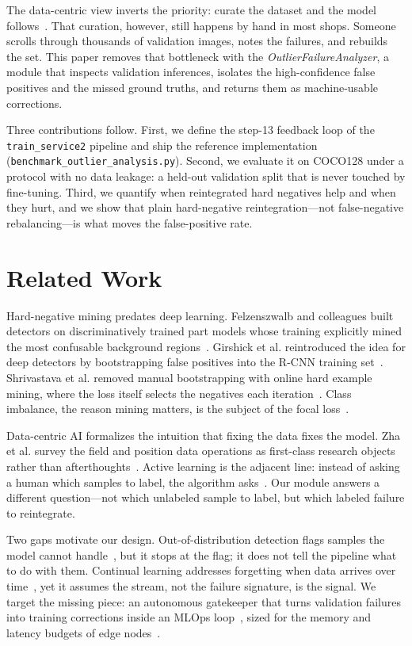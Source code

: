 \documentclass[conference]{IEEEtran}
\begin{document}
The data-centric view inverts the priority: curate the dataset and the model
follows~\cite{zha2023datacentric}. That curation, however, still happens by
hand in most shops. Someone scrolls through thousands of validation images,
notes the failures, and rebuilds the set. This paper removes that bottleneck
with the \textit{OutlierFailureAnalyzer}, a module that inspects validation
inferences, isolates the high-confidence false positives and the missed ground
truths, and returns them as machine-usable corrections.

Three contributions follow. First, we define the step-13 feedback loop of the
\texttt{train\_service2} pipeline and ship the reference implementation
(\texttt{benchmark\_outlier\_analysis.py}). Second, we evaluate it on COCO128
under a protocol with no data leakage: a held-out validation split that is
never touched by fine-tuning. Third, we quantify when reintegrated hard
negatives help and when they hurt, and we show that plain hard-negative
reintegration---not false-negative rebalancing---is what moves the
false-positive rate.

\section{Related Work}
Hard-negative mining predates deep learning. Felzenszwalb and colleagues
built detectors on discriminatively trained part models whose training
explicitly mined the most confusable background regions~\cite{felzenszwalb2010dpm}.
Girshick et al. reintroduced the idea for deep detectors by bootstrapping
false positives into the R-CNN training set~\cite{girshick2014rcnn}.
Shrivastava et al. removed manual bootstrapping with online hard example
mining, where the loss itself selects the negatives each
iteration~\cite{shrivastava2016hard}. Class imbalance, the reason mining
matters, is the subject of the focal loss~\cite{lin2017focal}.

Data-centric AI formalizes the intuition that fixing the data fixes the
model. Zha et al. survey the field and position data operations as first-class
research objects rather than afterthoughts~\cite{zha2023datacentric}. Active
learning is the adjacent line: instead of asking a human which samples to
label, the algorithm asks~\cite{settles2012active}. Our module answers a
different question---not which unlabeled sample to label, but which labeled
failure to reintegrate.

Two gaps motivate our design. Out-of-distribution detection flags samples the
model cannot handle~\cite{hendrycks2017ood}, but it stops at the flag; it does
not tell the pipeline what to do with them. Continual learning addresses
forgetting when data arrives over time~\cite{parisi2019continual}, yet it
assumes the stream, not the failure signature, is the signal. We target the
missing piece: an autonomous gatekeeper that turns validation failures into
training corrections inside an MLOps loop~\cite{kreuzberger2023mlops}, sized
for the memory and latency budgets of edge nodes~\cite{zhou2019edge}.
\end{document}
